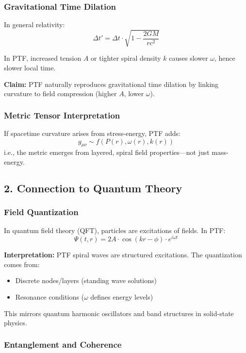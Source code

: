 \documentclass[a4paper,12pt]{article}
\begin{document}
\subsubsection*{Gravitational Time Dilation}

In general relativity:
\[
\Delta t' = \Delta t \cdot \sqrt{1 - \frac{2GM}{rc^2}}
\]

In PTF, increased tension $A$ or tighter spiral density $k$ causes slower $\omega$, hence slower local time.

\textbf{Claim:}  
PTF naturally reproduces gravitational time dilation by linking curvature to field compression (higher $A$, lower $\omega$).

\subsubsection*{Metric Tensor Interpretation}

If spacetime curvature arises from stress-energy, PTF adds:
\[
g_{\mu\nu} \sim f(P(r), \omega(r), k(r))
\]
i.e., the metric emerges from layered, spiral field properties—not just mass-energy.

\subsection{2. Connection to Quantum Theory}

\subsubsection*{Field Quantization}

In quantum field theory (QFT), particles are excitations of fields.  
In PTF:
\[
\Psi(t, r) = 2A \cdot \cos(kr - \phi) \cdot e^{i\omega t}
\]

\textbf{Interpretation:}  
PTF spiral waves are structured excitations. The quantization comes from:
\begin{itemize}
    \item Discrete nodes/layers (standing wave solutions)
    \item Resonance conditions ($\omega$ defines energy levels)
\end{itemize}

This mirrors quantum harmonic oscillators and band structures in solid-state physics.

\subsubsection*{Entanglement and Coherence}
\end{document}
